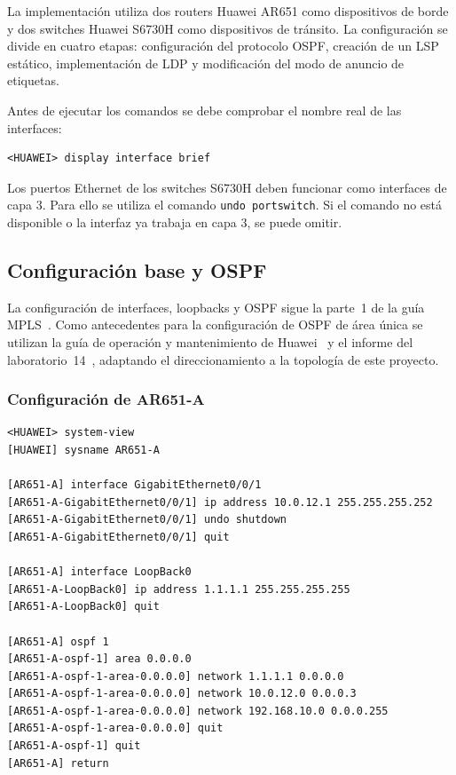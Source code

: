 La implementación utiliza dos routers Huawei AR651 como dispositivos de
borde y dos switches Huawei S6730H como dispositivos de tránsito. La
configuración se divide en cuatro etapas: configuración del protocolo OSPF,
creación de un LSP estático, implementación de LDP y modificación del modo
de anuncio de etiquetas.

Antes de ejecutar los comandos se debe comprobar el nombre real de las
interfaces:

\begin{lstlisting}[style=terminal]
<HUAWEI> display interface brief
\end{lstlisting}

Los puertos Ethernet de los switches S6730H deben funcionar como interfaces
de capa 3. Para ello se utiliza el comando \texttt{undo portswitch}. Si el
comando no está disponible o la interfaz ya trabaja en capa 3, se puede
omitir.

\subsection{Configuración base y OSPF}

La configuración de interfaces, loopbacks y OSPF sigue la parte~1 de la guía
MPLS~\cite[parte~1]{guia-mpls-ar651-s6730h}. Como antecedentes para la
configuración de OSPF de área única se utilizan la guía de operación y
mantenimiento de Huawei~\cite[sec.~1.4.2, pasos~1--2]{huawei-om-automatico}
y el informe del laboratorio~14~\cite[pp.~2--7]{lab14-ospf-ssh-paramiko},
adaptando el direccionamiento a la topología de este proyecto.

\subsubsection{Configuración de AR651-A}

\begin{lstlisting}[style=terminal]
<HUAWEI> system-view
[HUAWEI] sysname AR651-A

[AR651-A] interface GigabitEthernet0/0/1
[AR651-A-GigabitEthernet0/0/1] ip address 10.0.12.1 255.255.255.252
[AR651-A-GigabitEthernet0/0/1] undo shutdown
[AR651-A-GigabitEthernet0/0/1] quit

[AR651-A] interface LoopBack0
[AR651-A-LoopBack0] ip address 1.1.1.1 255.255.255.255
[AR651-A-LoopBack0] quit

[AR651-A] ospf 1
[AR651-A-ospf-1] area 0.0.0.0
[AR651-A-ospf-1-area-0.0.0.0] network 1.1.1.1 0.0.0.0
[AR651-A-ospf-1-area-0.0.0.0] network 10.0.12.0 0.0.0.3
[AR651-A-ospf-1-area-0.0.0.0] network 192.168.10.0 0.0.0.255
[AR651-A-ospf-1-area-0.0.0.0] quit
[AR651-A-ospf-1] quit
[AR651-A] return
\end{lstlisting}

